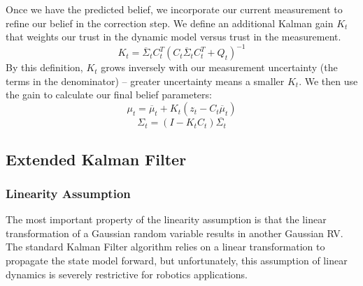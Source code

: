 \documentclass[twoside]{article}
\begin{document}
Once we have the predicted belief, we incorporate our current measurement to refine our belief in the correction step. We define an additional Kalman gain $K_t$ that weights our trust in the dynamic model versus trust in the measurement.
\begin{equation}
    K_t = \overline{\Sigma}_t C_t^T (C_t \overline{\Sigma}_t C_t^T + Q_t)^{-1}
\end{equation}
By this definition, $K_t$ grows inversely with our measurement uncertainty (the terms in the denominator) -- greater uncertainty means a smaller $K_t$. We then use the gain to calculate our final belief parameters:
\begin{equation}
    \mu_t = \overline{\mu}_t + K_t(z_t - C_t \overline{\mu}_t)
\end{equation}
\begin{equation}
    \Sigma_t = (I - K_t C_t) \overline{\Sigma_t}
\end{equation}

\subsection{Extended Kalman Filter}

\subsubsection{Linearity Assumption}
The most important property of the linearity assumption is that the linear transformation of a Gaussian random variable results in another Gaussian RV. The standard Kalman Filter algorithm relies on a linear transformation to propagate the state model forward, but unfortunately, this assumption of linear dynamics is severely restrictive for robotics applications.
\end{document}
